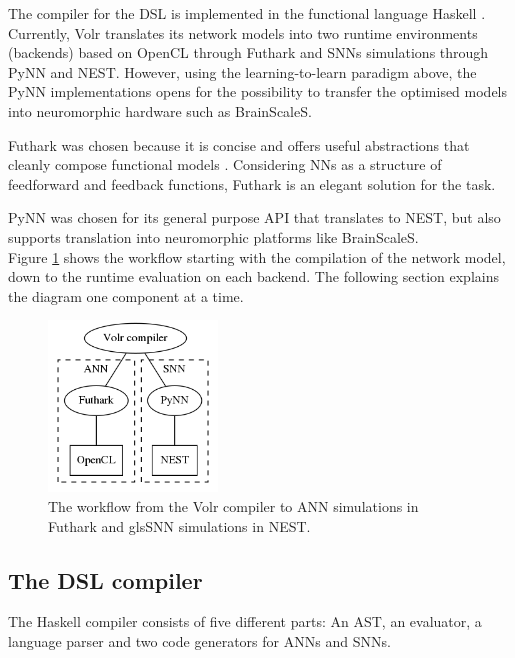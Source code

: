 The compiler for the \gls{DSL} is implemented in the functional language
Haskell \cite{Haskell}.
Currently, Volr translates its network models into two runtime
environments (backends) based on \gls{OpenCL} through Futhark and
\glspl{SNN} simulations through PyNN and NEST.
However, using the learning-to-learn paradigm above, the PyNN implementations
opens for the possibility to transfer the optimised models into neuromorphic
hardware such as BrainScaleS.

Futhark was chosen because it is concise and offers
useful abstractions that cleanly compose functional
models \cite{Henriksen2017}.
Considering \glspl{NN} as a structure of feedforward and feedback functions,
Futhark is an elegant solution for the task.

PyNN was chosen for its general purpose API that translates to NEST, but also
supports translation into neuromorphic platforms like BrainScaleS.  
\\[0.2cm]
Figure \ref{fig:volr-architecture} shows the workflow starting with the
compilation of the network model, down to the runtime evaluation on each backend.
The following section explains the diagram one component at a time.

\begin{figure}
  \centering
  \includegraphics[width=0.4\textwidth]{images/volr-architecture.png}
  \caption{The workflow from the Volr compiler to 
    \gls{ANN} simulations in Futhark and gls{SNN} simulations in NEST.
  }
  \label{fig:volr-architecture}
\end{figure}

\subsection{The DSL compiler}
The Haskell compiler consists of five different parts:
An \gls{AST}, an evaluator, a language parser and two
code generators for \glspl{ANN} and \glspl{SNN}.

